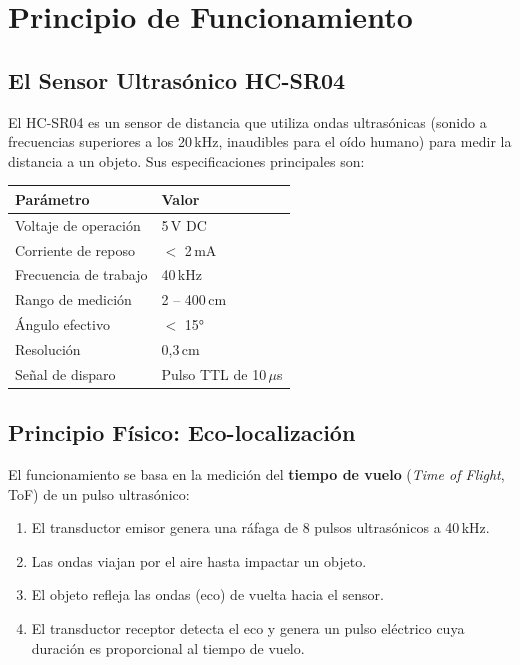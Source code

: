 \documentclass[12pt,a4paper]{article}
\begin{document}
\section{Principio de Funcionamiento}

\subsection{El Sensor Ultrasónico HC-SR04}

El HC-SR04 es un sensor de distancia que utiliza ondas ultrasónicas (sonido a frecuencias superiores a los 20\,kHz, inaudibles para el oído humano) para medir la distancia a un objeto. Sus especificaciones principales son:

\begin{center}
\begin{tabular}{ll}
\toprule
\textbf{Parámetro} & \textbf{Valor} \\
\midrule
Voltaje de operación & 5\,V DC \\
Corriente de reposo & $<$ 2\,mA \\
Frecuencia de trabajo & 40\,kHz \\
Rango de medición & 2 -- 400\,cm \\
Ángulo efectivo & $<$ 15° \\
Resolución & 0,3\,cm \\
Señal de disparo & Pulso TTL de 10\,$\mu$s \\
\bottomrule
\end{tabular}
\end{center}

\subsection{Principio Físico: Eco-localización}

El funcionamiento se basa en la medición del \textbf{tiempo de vuelo} (\textit{Time of Flight}, ToF) de un pulso ultrasónico:

\begin{enumerate}
    \item El transductor emisor genera una ráfaga de 8 pulsos ultrasónicos a 40\,kHz.
    \item Las ondas viajan por el aire hasta impactar un objeto.
    \item El objeto refleja las ondas (eco) de vuelta hacia el sensor.
    \item El transductor receptor detecta el eco y genera un pulso eléctrico cuya duración es proporcional al tiempo de vuelo.
\end{enumerate}
\end{document}
